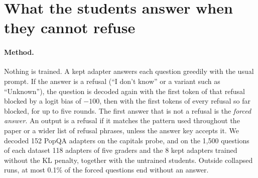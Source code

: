 \documentclass[11pt,a4paper,twocolumn]{article}
\newcommand{\idk}{``I don't know''}
\begin{document}
\section{What the students answer when they cannot refuse}
\label{app:forced}

\paragraph{Method.} Nothing is trained. A kept adapter answers each question greedily with the usual prompt. If the answer is a refusal (\idk{} or a variant such as ``Unknown''), the question is decoded again with the first token of that refusal blocked by a logit bias of $-100$, then with the first tokens of every refusal so far blocked, for up to five rounds. The first answer that is not a refusal is the \emph{forced answer}. An output is a refusal if it matches the pattern used throughout the paper or a wider list of refusal phrases, unless the answer key accepts it. We decoded 152 PopQA adapters on the capitals probe, and on the 1{,}500 questions of each dataset 118 adapters of five graders and the 8 kept adapters trained without the KL penalty, together with the untrained students. Outside collapsed runs, at most 0.1\% of the forced questions end without an answer.
\end{document}

